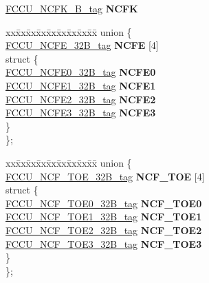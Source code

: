 \begin{DoxyCompactItemize}
\begin{tabbing}
\end{tabbing}\item 
\mbox{\label{structFCCU__struct__tag_a209ccae53cd799bb3d25e1c28e548054}} 
\mbox{\hyperlink{unionFCCU__NCFK__32B__tag}{F\+C\+C\+U\+\_\+\+N\+C\+F\+K\+\_\+B\+\_\+tag}} {\bfseries N\+C\+FK}
\item 
\mbox{\label{structFCCU__struct__tag_a86efebb5eb119b185499a35c50bf8cfe}} 
\begin{tabbing}
xx\=xx\=xx\=xx\=xx\=xx\=xx\=xx\=xx\=\kill
union \{\\
\>\mbox{\hyperlink{unionFCCU__NCFE__32B__tag}{FCCU\_NCFE\_32B\_tag}} {\bfseries NCFE} \mbox{[}4\mbox{]}\\
\mbox{\label{unionFCCU__struct__tag_1_1_0D2098_af420268c06c29f9d7309b283a4e10c1d}} 
\>struct \{\\
\>\>\mbox{\hyperlink{unionFCCU__NCFE0__32B__tag}{FCCU\_NCFE0\_32B\_tag}} {\bfseries NCFE0}\\
\>\>\mbox{\hyperlink{unionFCCU__NCFE1__32B__tag}{FCCU\_NCFE1\_32B\_tag}} {\bfseries NCFE1}\\
\>\>\mbox{\hyperlink{unionFCCU__NCFE2__32B__tag}{FCCU\_NCFE2\_32B\_tag}} {\bfseries NCFE2}\\
\>\>\mbox{\hyperlink{unionFCCU__NCFE3__32B__tag}{FCCU\_NCFE3\_32B\_tag}} {\bfseries NCFE3}\\
\>\} \\
\}; \\

\end{tabbing}\item 
\mbox{\label{structFCCU__struct__tag_a4e69ef74c4b213730b009b4a7327773f}} 
\begin{tabbing}
xx\=xx\=xx\=xx\=xx\=xx\=xx\=xx\=xx\=\kill
union \{\\
\>\mbox{\hyperlink{unionFCCU__NCF__TOE__32B__tag}{FCCU\_NCF\_TOE\_32B\_tag}} {\bfseries NCF\_TOE} \mbox{[}4\mbox{]}\\
\mbox{\label{unionFCCU__struct__tag_1_1_0D2100_ae544388dd2fda3f988ebeeb93d078802}} 
\>struct \{\\
\>\>\mbox{\hyperlink{unionFCCU__NCF__TOE0__32B__tag}{FCCU\_NCF\_TOE0\_32B\_tag}} {\bfseries NCF\_TOE0}\\
\>\>\mbox{\hyperlink{unionFCCU__NCF__TOE1__32B__tag}{FCCU\_NCF\_TOE1\_32B\_tag}} {\bfseries NCF\_TOE1}\\
\>\>\mbox{\hyperlink{unionFCCU__NCF__TOE2__32B__tag}{FCCU\_NCF\_TOE2\_32B\_tag}} {\bfseries NCF\_TOE2}\\
\>\>\mbox{\hyperlink{unionFCCU__NCF__TOE3__32B__tag}{FCCU\_NCF\_TOE3\_32B\_tag}} {\bfseries NCF\_TOE3}\\
\>\} \\
\}; \\


\end{tabbing}
\end{DoxyCompactItemize}
